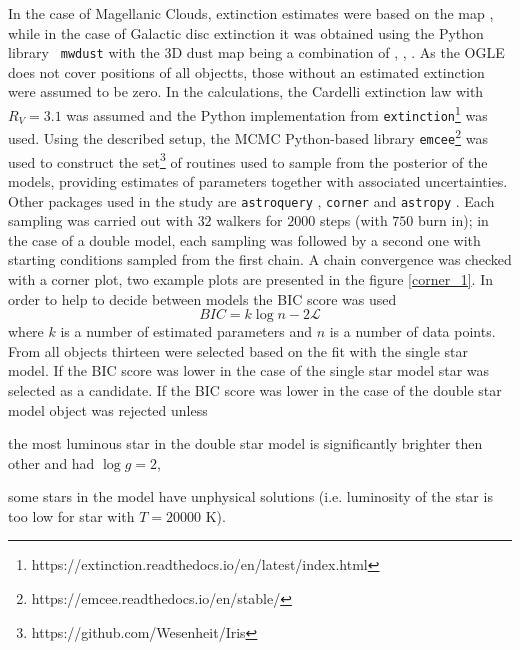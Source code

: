 \documentclass{pracalicmgr}
\newenvironment{itemize*}%
  {\vspace{-\topsep}
    \begin{itemize}%
    \setlength{\itemsep}{0pt}%
    \setlength{\parskip}{0pt}}%
  {\end{itemize}
  \vspace{-\topsep}}
\begin{document}
In the case of Magellanic Clouds, extinction estimates were based on the map \citet{skowron_ogle-ing_2021}, while in the case of Galactic disc extinction it
was obtained using the Python library \texttt{ mwdust} \citep{bovy_galactic_2016} with the 3D dust map being a combination of \citet{green_3d_2019}, \citet{greiner_unusually_2001},
\citet{drimmel_three-dimensional_2003}.
As the OGLE does not cover positions of all objectts, those without an estimated extinction were assumed to be zero.
In the calculations, the Cardelli extinction law \citep{cardelli_relationship_1989} with $R_V=3.1$ was assumed
and the Python implementation from \texttt{extinction}\footnote{https://extinction.readthedocs.io/en/latest/index.html} was used.
Using the described setup, the MCMC Python-based library \texttt{emcee}\footnote{https://emcee.readthedocs.io/en/stable/} \citep{foreman-mackey_emcee_2013}
was used to construct the set\footnote{https://github.com/Wesenheit/Iris} of routines used to sample from the posterior of the models, providing estimates of parameters together
with associated uncertainties.
Other packages used in the study are \texttt{astroquery} \citep{ginsburg_astroquery_2019},
\texttt{corner} \citep{foreman-mackey_cornerpy_2016} and \texttt{astropy} \citep{astropy_collaboration_astropy_2022}.
Each sampling was carried out with $32$ walkers for $2000$ steps (with $750$ burn in); in the case of a double model, each sampling 
was followed by a second one with starting conditions sampled from the first chain. 
A chain convergence was checked with a corner plot, two example plots are presented in the figure
\ref{corner_1}.
In order to help to decide between models
the BIC score was used 
\begin{equation}
    BIC=k\log{n}-2\mathcal{L}
\end{equation} where $k$ is a number of estimated parameters and $n$ is a number of data points. From all objects thirteen were selected based on the
fit with the single star model.
If the BIC score was lower in the case of the single star model star was selected as a candidate.
If the BIC score was lower in the case of the double star model object was rejected unless
\begin{itemize*}
    \item the most luminous star in the double star model is significantly brighter then other and had $\log g=2$,
    \item some stars in the model have unphysical solutions (i.e. luminosity of the star is too low for star with $T=20000$ K).
\end{itemize*}
\end{document}

